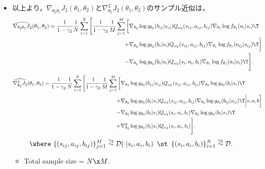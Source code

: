\documentclass[a4paper,10pt,dvipdfmx]{jsarticle}
\begin{document}
\begin{itemize}
    \item 以上より，$\nabla_{\theta_2\theta_1}J_2(\theta_1,\theta_2)$と$\nabla_{\theta_2}^2J_2(\theta_1,\theta_2)$のサンプル近似は，
    \begin{align}
        \widehat{\nabla_{\theta_2\theta_1}J_2}(\theta_1,\theta_2)
        =\dfrac{1}{1-\gamma_2}\dfrac{1}{N}\sum_{i=1}^N\Bigg[\dfrac{1}{1-\gamma_2}\dfrac{1}{M}\sum_{j=1}^M\bigg[&\nabla_{\theta_2}\log g_{\theta_2}(b_{ij}|s_{ij})Q_{\omega_2}(s_{ij},a_{ij},b_{ij})\nabla_{\theta_1}\log f_{\theta_1}(a_i|s_i)\T\nonumber\\
        +&\nabla_{\theta_2}\log g_{\theta_2}(b_i|s_i)Q_{\omega_2}(s_{ij},a_{ij},b_{ij})\nabla_{\theta_1}\log f_{\theta_1}(a_{ij}|s_{ij})\T\bigg]\nonumber\\
        -&\nabla_{\theta_2}\log g_{\theta_2}(b_i|s_i)Q_{\omega_2}(s_i,a_i,b_i)\nabla_{\theta_1}\log f_{\theta_1}(a_i|s_i)\T\Bigg].\label{eq:nabla_2_1_J_2_sampleapprox}
    \end{align}
    \begin{align}
        \widehat{\nabla_{\theta_2}^2J_2}(\theta_1,\theta_2)=\dfrac{1}{1-\gamma_2}\dfrac{1}{N}\sum_{i=1}^N\Bigg[\dfrac{1}{1-\gamma_2}\dfrac{1}{M}\sum_{j=1}^M\bigg[&\nabla_{\theta_2}\log g_{\theta_2}(b_{ij}|s_{ij})Q_{\omega_2}(s_{ij},a_{ij},b_{ij})\nabla_{\theta_2}\log g_{\theta_2}(b_i|s_i)\T\nonumber\\
        +&\nabla_{\theta_2}\log g_{\theta_2}(b_i|s_i)Q_{\omega_2}(s_{ij},a_{ij},b_{ij})\nabla_{\theta_2}\log g_{\theta_2}(b_{ij}|s_{ij})\T\bigg|s,a,b\bigg]\nonumber\\
        -&\nabla_{\theta_2}\log g_{\theta_2}(b_i|s_i)Q_{\omega_2}(s_i,a_i,b_i)\nabla_{\theta_2}\log g_{\theta_2}(b_i|s_i)\T\nonumber\\
        +&\nabla_{\theta_2}^2\log g_{\theta_2}(b_i|s_i)Q_{\omega_2}(s_i,a_i,b_i)\Bigg].\label{eq:nabla_2_2_J_2_sampleapprox}
    \end{align}
    \begin{align*}
        \where~
        \{(s_{ij},a_{ij},b_{ij})\}_{j=1}^M\overset{\gamma_2}{\sim}\mathcal{D}(\cdot|s_i,a_i,b_i)\enspace\st\enspace\{(s_i,a_i,b_i)\}_{i=1}^N\overset{\gamma_2}{\sim}\mathcal{D}.
    \end{align*}
    \begin{itemize}
        \item Total sample size = $N\x M$.
    \end{itemize}


\end{itemize}
\end{document}
